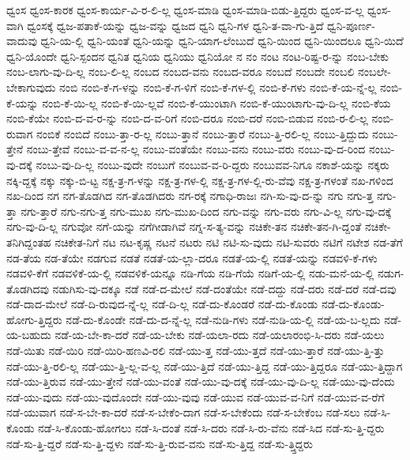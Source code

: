 {ಧ್ವಂಸ
ಧ್ವಂಸ-ಕಾರಕ
ಧ್ವಂಸ-ಕಾರ್ಯ-ವಿ-ರ-ಲಿ-ಲ್ಲ
ಧ್ವಂಸ-ಮಾಡಿ
ಧ್ವಂಸ-ಮಾಡಿ-ಬಿಡು-ತ್ತಿದ್ದರು
ಧ್ವಂಸ-ವ-ಲ್ಲ
ಧ್ವಂಸ-ವಾಗಿ
ಧ್ವಂಸಕ್ಕೆ
ಧ್ವಜ-ಪತಾಕೆ-ಯನ್ನು
ಧ್ವಜ-ವನ್ನು
ಧ್ವಜದ
ಧ್ವನಿ
ಧ್ವನಿ-ಗಳ
ಧ್ವನಿ-ತ-ವಾ-ಗು-ತ್ತಿದೆ
ಧ್ವನಿ-ಪೂರ್ಣ-ವಾದುವು
ಧ್ವನಿ-ಯ-ಲ್ಲಿ
ಧ್ವನಿ-ಯಂತೆ
ಧ್ವನಿ-ಯನ್ನು
ಧ್ವನಿ-ಯಾಗ-ಲೆಂಬುದೆ
ಧ್ವನಿ-ಯಿಂದ
ಧ್ವನಿ-ಯಿಂದಲೂ
ಧ್ವನಿ-ಯಿದೆ
ಧ್ವನಿ-ಯೊಂದೇ
ಧ್ವನಿ-ಸ್ಪಂದನ
ಧ್ವನಿತ
ಧ್ವನಿಯ
ಧ್ವನಿಯು
ಧ್ವನಿಯೋ
ನ
ನಂ
ನಂಟ
ನಂಟ-ರಿಷ್ಟ-ರ-ನ್ನು
ನಂಬ-ಬೇಕು
ನಂಬ-ಲಾಗು-ವು-ದಿ-ಲ್ಲ
ನಂಬ-ಲಿ-ಲ್ಲ
ನಂಬದ
ನಂಬದ-ವನು
ನಂಬದ-ವರೂ
ನಂಬದೆ
ನಂಬದೇ
ನಂಬಲಿ
ನಂಬಲೇ-ಬೇಕಾಗುವುದು
ನಂಬಿ
ನಂಬಿ-ಕೆ-ಗ-ಳನ್ನು
ನಂಬಿ-ಕೆ-ಗ-ಳಿಗೆ
ನಂಬಿ-ಕೆ-ಗಳ-ಲ್ಲಿ
ನಂಬಿ-ಕೆ-ಗಳು
ನಂಬಿ-ಕೆ-ಯ-ನ್ನೆ-ಲ್ಲ
ನಂಬಿ-ಕೆ-ಯನ್ನು
ನಂಬಿ-ಕೆ-ಯಿ-ಲ್ಲ
ನಂಬಿ-ಕೆ-ಯಿ-ಲ್ಲವೆ
ನಂಬಿ-ಕೆ-ಯುಂಟಾಗಿ
ನಂಬಿ-ಕೆ-ಯುಂಟಾಗು-ವು-ದಿ-ಲ್ಲ
ನಂಬಿ-ಕೆಯ
ನಂಬಿ-ಕೆಯೇ
ನಂಬಿ-ದ-ವ-ರ-ನ್ನು
ನಂಬಿ-ದ-ವ-ರಿಗೆ
ನಂಬಿ-ದರೂ
ನಂಬಿ-ದರೆ
ನಂಬಿ-ಬಿಡುವ
ನಂಬಿ-ರ-ಲಿ-ಲ್ಲ
ನಂಬಿ-ರುವಾಗ
ನಂಬಿಕೆ
ನಂಬಿದೆ
ನಂಬು-ತ್ತಾ-ರ-ಲ್ಲ
ನಂಬು-ತ್ತಾನೆ
ನಂಬು-ತ್ತಾರೆ
ನಂಬು-ತ್ತಿ-ರಲಿ-ಲ್ಲ
ನಂಬು-ತ್ತಿದ್ದುದು
ನಂಬು-ತ್ತೇನೆ
ನಂಬು-ತ್ತೇವೆ
ನಂಬು-ವ-ವ-ನ-ಲ್ಲ
ನಂಬು-ವಂತೆಯೇ
ನಂಬು-ವನು
ನಂಬು-ವರು
ನಂಬು-ವು-ದ-ರಿಂದ
ನಂಬು-ವು-ದಕ್ಕೆ
ನಂಬು-ವು-ದಿ-ಲ್ಲ
ನಂಬು-ವುದೇ
ನಂಬುಗೆ
ನಂಬುವ-ವ-ರಿ-ದ್ದರು
ನಂಬುವವ-ನಿಗೂ
ನಕಾಶೆ-ಯನ್ನು
ನಕ್ಕರು
ನಕ್ಕಿ-ದ್ದಕ್ಕೆ
ನಕ್ಕು
ನಕ್ಕು-ಬಿ-ಟ್ಟ
ನಕ್ಷ-ತ್ರ-ಗ-ಳನ್ನು
ನಕ್ಷ-ತ್ರ-ಗಳ-ಲ್ಲಿ
ನಕ್ಷ-ತ್ರ-ಗಳ-ಲ್ಲಿ-ರು-ವೆವು
ನಕ್ಷ-ತ್ರ-ಗಳಂತೆ
ನಖ-ಗಳಿಂದ
ನಖ-ದಿಂದ
ನಗ
ನಗ-ತೊಡಗಿದ
ನಗ-ತೊಡಗಿದರು
ನಗ-ರಕ್ಕೆ
ನಗಾಧಿ-ರಾಜಃ
ನಗಿ-ಸು-ವು-ದ-ನ್ನು
ನಗು
ನಗು-ತ್ತ
ನಗು-ತ್ತಾ
ನಗು-ತ್ತಾರೆ
ನಗು-ನಗು-ತ್ತ
ನಗು-ಮುಖ
ನಗು-ಮುಖ-ದಿಂದ
ನಗು-ವನ್ನು
ನಗು-ವರು
ನಗು-ವಿ-ಲ್ಲ
ನಗು-ವು-ದಕ್ಕೆ
ನಗು-ವು-ದಿ-ಲ್ಲ
ನಗುವೋ
ನಗೆ-ಯನ್ನು
ನಗೆಗೀಡಾಗಿವೆ
ನಗ್ನ-ಸ-ತ್ಯ-ವನ್ನು
ನಚಿಕೇ-ತನ
ನಚಿಕೇ-ತನ-ಗಿ-ದ್ದಂತೆ
ನಚಿಕೇ-ತನಿಗಿದ್ದಂತಹ
ನಚಿಕೇತ-ನಿಗೆ
ನಟ
ನಟ-ಕೃಷ್ಣ
ನಟನೆ
ನಟರು
ನಟಿ
ನಟಿ-ಸು-ವುದು
ನಟಿ-ಸುವರು
ನಟಿಗೆ
ನಟೇಶ
ನಡ-ತೆಗೆ
ನಡ-ತೆಯ
ನಡ-ತೆಯೇ
ನಡಗುವ
ನಡತೆ
ನಡತೆ-ಯ-ಲ್ಲಾ-ದರೂ
ನಡತೆ-ಯ-ಲ್ಲಿ
ನಡತೆ-ಯನ್ನು
ನಡವಳಿ-ಕೆ-ಗಳು
ನಡವಳಿ-ಕೆಗೆ
ನಡವಳಿಕೆ-ಯ-ಲ್ಲಿ
ನಡವಳಿಕೆ-ಯನ್ನೂ
ನಡಿ-ಗೆಯ
ನಡಿ-ಗೆಯೆ
ನಡಿಗೆ-ಯ-ಲ್ಲಿ
ನಡು-ಮನೆ-ಯ-ಲ್ಲಿ
ನಡುಗ-ತೊಡಗಿದವು
ನಡುಗಿಸು-ವು-ದಕ್ಕೂ
ನಡೆ
ನಡೆ-ದ-ಮೇಲೆ
ನಡೆ-ದಂತೆಯೇ
ನಡೆ-ದದ್ದು
ನಡೆ-ದರು
ನಡೆ-ದರೆ
ನಡೆ-ದವು
ನಡೆ-ದಾದ-ಮೇಲೆ
ನಡೆ-ದಿ-ರುವುದ-ನ್ನೆ-ಲ್ಲ
ನಡೆ-ದಿ-ಲ್ಲ
ನಡೆ-ದು-ಕೊಂಡರೆ
ನಡೆ-ದು-ಕೊಂಡು
ನಡೆ-ದು-ಕೊಂಡು-ಹೋಗು-ತ್ತಿದ್ದರು
ನಡೆ-ದು-ಕೊಂಡೇ
ನಡೆ-ದು-ದ-ನ್ನೆ-ಲ್ಲ
ನಡೆ-ನುಡಿ-ಗಳು
ನಡೆ-ನುಡಿ-ಯ-ಲ್ಲಿ
ನಡೆ-ಯ-ಬ-ಲ್ಲದು
ನಡೆ-ಯ-ಬಹುದು
ನಡೆ-ಯ-ಬೇ-ಕಾ-ದರೆ
ನಡೆ-ಯ-ಬೇಕು
ನಡೆ-ಯಲಾ-ರದು
ನಡೆ-ಯಲಾರಂಭಿ-ಸಿ-ದರು
ನಡೆ-ಯಲು
ನಡೆ-ಯಿತು
ನಡೆ-ಯಿರಿ
ನಡೆ-ಯಿರಿ-ಹಣವಿ-ರಲಿ
ನಡೆ-ಯು-ತ್ತ
ನಡೆ-ಯು-ತ್ತದೆ
ನಡೆ-ಯು-ತ್ತಾರೆ
ನಡೆ-ಯು-ತ್ತಿ-ತ್ತು
ನಡೆ-ಯು-ತ್ತಿ-ರಲಿ-ಲ್ಲ
ನಡೆ-ಯು-ತ್ತಿ-ಲ್ಲ-ವ-ಲ್ಲ
ನಡೆ-ಯು-ತ್ತಿದೆ
ನಡೆ-ಯು-ತ್ತಿದ್ದ
ನಡೆ-ಯು-ತ್ತಿದ್ದರೂ
ನಡೆ-ಯು-ತ್ತಿದ್ದಾಗ
ನಡೆ-ಯು-ತ್ತಿರುವ
ನಡೆ-ಯು-ತ್ತೇನೆ
ನಡೆ-ಯು-ವಂತೆ
ನಡೆ-ಯು-ವು-ದಕ್ಕೆ
ನಡೆ-ಯು-ವು-ದಿ-ಲ್ಲ
ನಡೆ-ಯು-ವು-ದೆಂದು
ನಡೆ-ಯು-ವುದು
ನಡೆ-ಯು-ವುದೊಂದೇ
ನಡೆ-ಯು-ವುವು
ನಡೆ-ಯುವ
ನಡೆ-ಯುವ-ವ-ನಿಗೆ
ನಡೆ-ಯುವ-ವ-ರೆಗೆ
ನಡೆ-ಯುವಾಗ
ನಡೆ-ಸ-ಬೇ-ಕಾ-ದರೆ
ನಡೆ-ಸ-ಬೇಕೆಂ-ದಾಗ
ನಡೆ-ಸ-ಬೇಕೆಂದು
ನಡೆ-ಸ-ಬೇಕೆಂಬ
ನಡೆ-ಸಲು
ನಡೆ-ಸಿ-ಕೊಂಡು
ನಡೆ-ಸಿ-ಕೊಂಡು-ಹೋಗಲು
ನಡೆ-ಸಿ-ದಂತೆ
ನಡೆ-ಸಿ-ದರು
ನಡೆ-ಸಿ-ರು-ವೆನು
ನಡೆ-ಸಿದ
ನಡೆ-ಸು-ತ್ತಿ-ದ್ದರು
ನಡೆ-ಸು-ತ್ತಿ-ದ್ದರೆ
ನಡೆ-ಸು-ತ್ತಿ-ದ್ದಳು
ನಡೆ-ಸು-ತ್ತಿ-ರುವ-ವನು
ನಡೆ-ಸು-ತ್ತಿದ್ದ
ನಡೆ-ಸು-ತ್ತ್ತಿದ್ದರು
}
